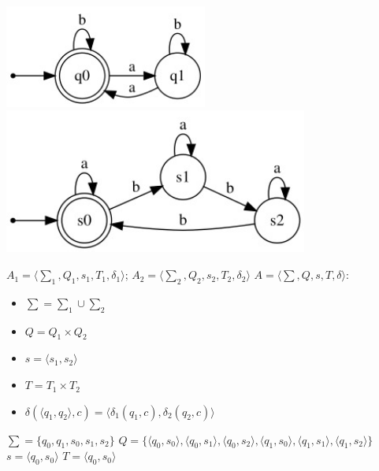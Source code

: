 \documentclass[a4paper,12pt]{article}
\begin{document}
\begin{center}
\includegraphics[width=0.5\textwidth]{2_3_1}\newline
\includegraphics[width=0.75\textwidth]{2_3_2}\newline
\end{center}
$A_1 = {\langle\sum_1 , Q_1, s_1, T_1, \delta_1 \rangle}$;
$A_2 = {\langle\sum_2 , Q_2, s_2, T_2, \delta_2 \rangle}$\newline
$A = {\langle\sum , Q, s, T, \delta \rangle}$:
\begin{itemize}
\item $\sum = \sum_1 \cup \sum_2$
\item $Q = Q_1 \times Q_2$
\item $s = \langle s_1 , s_2\rangle$
\item $T = T_1 \times T_2$
\item $\delta(\langle q_1 , q_2\rangle, c) =  \langle \delta_1 (q_1 , c), \delta_2 (q_2, c) \rangle$
\end{itemize}
$\sum = \{q_0, q_1, s_0, s_1, s_2\}$\newline
\normalsize $Q = \{\langle q_0 , s_0 \rangle ,\langle q_0 , s_1 \rangle ,\langle q_0 , s_2 \rangle , \langle q_1 , s_0 \rangle , \langle q_1 , s_1 \rangle , \langle q_1 , s_2 \rangle \}$\newline
\Large $s = \langle q_0 , s_0 \rangle$\newline
$T = \langle q_0 , s_0 \rangle$\newline
\end{document}
